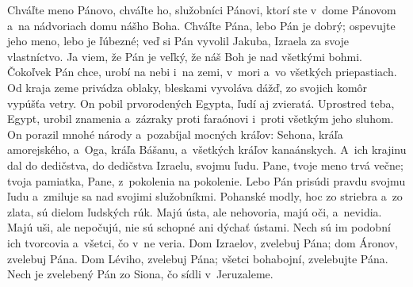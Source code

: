 Chváľte meno Pánovo,
chváľte ho, služobníci Pánovi,
\versseparator
ktorí ste v~dome Pánovom
a~na nádvoriach domu nášho Boha.
\versseparator
Chváľte Pána, lebo Pán je dobrý;
ospevujte jeho meno, lebo je ľúbezné;
\versseparator
veď si Pán vyvolil Jakuba,
Izraela za svoje vlastníctvo.
\versseparator
Ja viem, že Pán je veľký,
že náš Boh je nad všetkými bohmi.
\versseparator
Čokoľvek Pán chce,
urobí na nebi i~na zemi,
v~mori a~vo všetkých priepastiach.
\versseparator
Od kraja zeme privádza oblaky,
bleskami vyvoláva dážď,
\versseparator
zo svojich komôr vypúšťa vetry.
On pobil prvorodených Egypta,
ľudí aj zvieratá.
\versseparator
Uprostred teba, Egypt, urobil znamenia a~zázraky
proti faraónovi i~proti všetkým jeho sluhom.
\versseparator
On porazil mnohé národy
a~pozabíjal mocných kráľov:
\versseparator
Sehona, kráľa amorejského,
a~Oga, kráľa Bášanu,
a~všetkých kráľov kanaánskych.
\versseparator
A~ich krajinu dal do dedičstva,
do dedičstva Izraelu, svojmu ľudu.
\versseparator
Pane, tvoje meno trvá večne;
tvoja pamiatka, Pane, z~pokolenia na pokolenie.
\versseparator
Lebo Pán prisúdi pravdu svojmu ľudu
a~zmiluje sa nad svojimi služobníkmi.
\versseparator
Pohanské modly, hoc zo striebra a~zo zlata,
sú dielom ľudských rúk.
\versseparator
Majú ústa, ale nehovoria,
majú oči, a~nevidia.
\versseparator
Majú uši, ale nepočujú,
nie sú schopné ani dýchať ústami.
\versseparator
Nech sú im podobní ich tvorcovia
a~všetci, čo v~ne veria.
\versseparator
Dom Izraelov, zvelebuj Pána;
dom Áronov, zvelebuj Pána.
\versseparator
Dom Léviho, zvelebuj Pána;
všetci bohabojní, zvelebujte Pána.
\versseparator
Nech je zvelebený Pán zo Siona,
čo sídli v~Jeruzaleme.